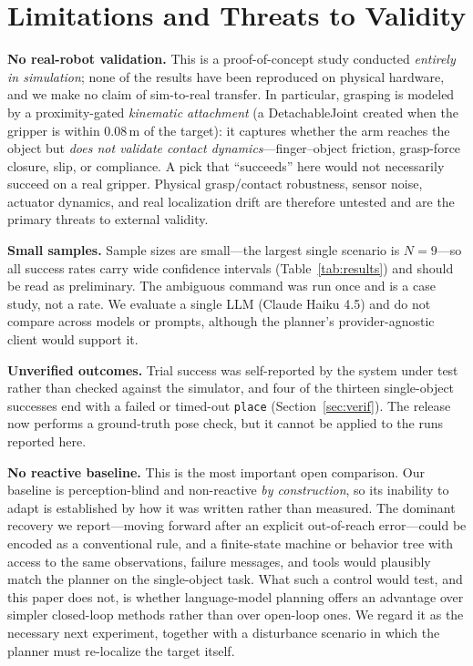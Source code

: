 \documentclass[conference]{IEEEtran}
\begin{document}
\section{Limitations and Threats to Validity}
\label{sec:limitations}

\textbf{No real-robot validation.} This is a proof-of-concept study
conducted \emph{entirely in simulation}; none of the results have been
reproduced on physical hardware, and we make no claim of sim-to-real
transfer. In particular, grasping is modeled by a proximity-gated
\emph{kinematic attachment} (a DetachableJoint created when the gripper is
within 0.08\,m of the target): it captures whether the arm reaches the object
but \emph{does not validate contact dynamics}---finger--object friction,
grasp-force closure, slip, or compliance. A pick that ``succeeds'' here would
not necessarily succeed on a real gripper. Physical grasp/contact robustness,
sensor noise, actuator dynamics, and real localization drift are therefore
untested and are the primary threats to external validity.

\textbf{Small samples.} Sample sizes are small---the largest single
scenario is $N=9$---so all success rates carry wide confidence intervals
(Table~\ref{tab:results}) and should be read as preliminary. The ambiguous
command was run once and is a case study, not a rate. We evaluate a single
LLM (Claude Haiku 4.5) and do not compare across models or prompts,
although the planner's provider-agnostic client would support it.

\textbf{Unverified outcomes.} Trial success was self-reported by the system
under test rather than checked against the simulator, and four of the
thirteen single-object successes end with a failed or timed-out
\texttt{place} (Section~\ref{sec:verif}). The release now performs a
ground-truth pose check, but it cannot be applied to the runs reported
here.

\textbf{No reactive baseline.} This is the most important open comparison.
Our baseline is perception-blind and non-reactive \emph{by construction},
so its inability to adapt is established by how it was written rather than
measured. The dominant recovery we report---moving forward after an
explicit out-of-reach error---could be encoded as a conventional rule, and
a finite-state machine or behavior tree with access to the same
observations, failure messages, and tools would plausibly match the planner
on the single-object task. What such a control would test, and this paper
does not, is whether language-model planning offers an advantage over
simpler closed-loop methods rather than over open-loop ones. We regard it
as the necessary next experiment, together with a disturbance scenario in
which the planner must re-localize the target itself.
\end{document}
